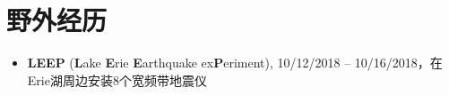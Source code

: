 \section*{野外经历}
\begin{itemize}
\item \textbf{LEEP} (\textbf{L}ake \textbf{E}rie \textbf{E}arthquake ex\textbf{P}eriment),
      10/12/2018 -- 10/16/2018，在Erie湖周边安装8个宽频带地震仪
\end{itemize}
